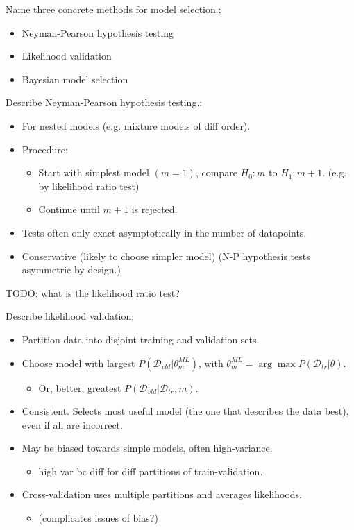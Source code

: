 \documentclass{article}
\begin{document}
Name three concrete methods for model selection.; \begin{itemize} \item Neyman-Pearson hypothesis testing \item Likelihood validation \item Bayesian model selection \end{itemize}

Describe Neyman-Pearson hypothesis testing.; \begin{itemize} \item For nested models (e.g. mixture models of diff order).  \item Procedure: \begin{itemize} \item Start with simplest model $(m=1)$, compare $H_0: m$ to $H_1: m+1$. (e.g. by likelihood ratio test) \item Continue until $m+1$ is rejected.  \end{itemize} \item Tests often only exact asymptotically in the number of datapoints.  \item Conservative (likely to choose simpler model) (N-P hypothesis tests asymmetric by design.) \end{itemize}

TODO: what is the likelihood ratio test?

Describe likelihood validation; \begin{itemize} \item Partition data into disjoint training and validation sets.  \item Choose model with largest $P(\mathcal{D}_{vld}|\theta_m^{ML})$, with $\theta_m^{ML}=\arg\max P(\mathcal{D}_{tr}|\theta)$.  \begin{itemize} \item Or, better, greatest $P(\mathcal{D}_{vld}|\mathcal{D}_{tr},m)$.  \end{itemize} \item Consistent. Selects most useful model (the one that describes the data best), even if all are incorrect.  \item May be biased towards simple models, often high-variance.  \begin{itemize} \item high var bc diff for diff partitions of train-validation.  \end{itemize} \item Cross-validation uses multiple partitions and averages likelihoods. \begin{itemize} \item (complicates issues of bias?) \end{itemize} \end{itemize}
\end{document}
